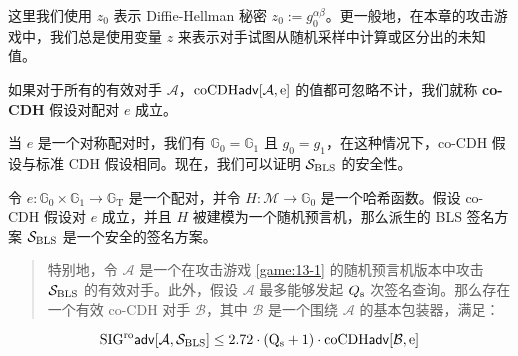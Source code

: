 这里我们使用 $z_0$ 表示 Diffie-Hellman 秘密 $z_0:=g_0^{\alpha\beta}$。更一般地，在本章的攻击游戏中，我们总是使用变量 $z$ 来表示对手试图从随机采样中计算或区分出的未知值。

\begin{definition}[co-CDH 假设]\label{def:15-3}
如果对于所有的有效对手 $\mathcal{A}$，$\rm{coCDH\mathsf{adv}}[\mathcal{A},e]$ 的值都可忽略不计，我们就称 \textbf{co-CDH} 假设对配对 $e$ 成立。
\end{definition}

当 $e$ 是一个对称配对时，我们有 $\mathbb{G}_0=\mathbb{G}_1$ 且 $g_0=g_1$，在这种情况下，co-CDH 假设与标准 CDH 假设相同。现在，我们可以证明 $\mathcal{S}_{\rm BLS}$ 的安全性。

\begin{theorem}\label{theo:15-1}
令 $e: \mathbb{G}_0 \times \mathbb{G}_1 \rightarrow \mathbb{G}_\mathrm{T}$ 是一个配对，并令 $H: \mathcal{M} \rightarrow \mathbb{G}_0$ 是一个哈希函数。假设 co-CDH 假设对 $e$ 成立，并且 $H$ 被建模为一个随机预言机，那么派生的 BLS 签名方案 $\mathcal{S}_{\rm BLS}$ 是一个安全的签名方案。
\begin{quote}
特别地，令 $\mathcal{A}$ 是一个在攻击游戏 \ref{game:13-1} 的随机预言机版本中攻击 $\mathcal{S}_{\rm BLS}$ 的有效对手。此外，假设 $\mathcal{A}$ 最多能够发起 $Q_{\rm s}$ 次签名查询。那么存在一个有效 co-CDH 对手 $\mathcal{B}$，其中 $\mathcal{B}$ 是一个围绕 $\mathcal{A}$ 的基本包装器，满足：
\end{quote}
\begin{equation}\label{eq:15-6}
\rm{SIG^{ro}\mathsf{adv}}[\mathcal{A},\mathcal{S}_{BLS}]\leq2.72\cdot(Q_s+1)\cdot\rm{coCDH\mathsf{adv}}[\mathcal{B},e]
\end{equation}
\end{theorem}

